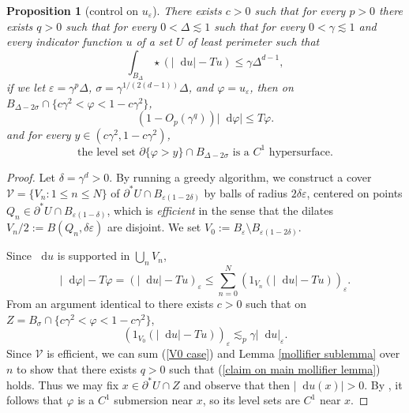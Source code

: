 \documentclass[reqno,12pt,letterpaper]{amsart}
\newcommand*\dif{\mathop{}\!\mathrm{d}}
\newcommand{\dfn}[1]{\emph{#1}\index{#1}}
\newtheorem{proposition}[theorem]{Proposition}
\theoremstyle{definition}
\numberwithin{equation}{section}
\begin{document}
\begin{proposition}[control on $u_\varepsilon$]\label{main mollifier lemma}
There exists $c > 0$ such that for every $p > 0$ there exists $q > 0$ such that for every $0 < \Delta \lesssim 1$ such that for every $0 < \gamma \lesssim 1$ and every indicator function $u$ of a set $U$ of least perimeter such that
\begin{equation}\label{hypothesis on main mollifier lemma}
\int_{B_\Delta} \star (|\dif u| - Tu) \leq \gamma \Delta^{d - 1},
\end{equation}
if we let $\varepsilon = \gamma^p\Delta$, $\sigma = \gamma^{1/(2(d - 1))}\Delta$, and $\varphi = u_\varepsilon$, then on $B_{\Delta - 2\sigma} \cap \{c\gamma^2 < \varphi < 1 - c\gamma^2\}$,
\begin{equation}\label{claim on main mollifier lemma}
(1 - O_p(\gamma^q)) |\dif \varphi| \leq T\varphi.
\end{equation}
and for every $y \in (c\gamma^2, 1 - c\gamma^2)$,
\begin{equation}\label{claim 2 on main mollifier lemma}
\text{the level set } \partial \{\varphi > y\} \cap B_{\Delta - 2\sigma} \text{ is a }C^1\text{ hypersurface}.
\end{equation}
\end{proposition}
\begin{proof}
Let $\delta = \gamma^d > 0$.
By running a greedy algorithm, we construct a cover $\mathcal V = \{V_n: 1 \leq n \leq N\}$ of $\partial^* U \cap B_{\varepsilon(1 - 2\delta)}$ by balls of radius $2\delta\varepsilon$, centered on points $Q_n \in \partial^* U \cap B_{\varepsilon(1 - \delta)}$, which is \dfn{efficient} in the sense that the dilates $V_n/2 := B(Q_n, \delta\varepsilon)$ are disjoint.
We set $V_0 := B_\varepsilon \setminus B_{\varepsilon(1 - 2\delta)}$.

Since $\dif u$ is supported in $\bigcup_n V_n$,
$$|\dif \varphi| - T\varphi = (|\dif u| - Tu)_\varepsilon \leq \sum_{n=0}^N (1_{V_n}(|\dif u| - Tu))_\varepsilon.$$
From an argument identical to \cite[pg92]{Giusti77} there exists $c > 0$ such that on $Z = B_\sigma \cap \{c\gamma^2 < \varphi < 1 - c\gamma^2\}$,
\begin{equation}\label{V0 case}
(1_{V_0}(|\dif u| - Tu))_\varepsilon \lesssim_p \gamma |\dif u|_\varepsilon.
\end{equation}
Since $\mathcal V$ is efficient, we can sum (\ref{V0 case}) and Lemma \ref{mollifier sublemma} over $n$ to show that there exists $q > 0$ such that (\ref{claim on main mollifier lemma}) holds. Thus we may fix $x \in \partial^* U \cap Z$ and observe that then $|\dif u(x)| > 0$.
By \cite[Remark 7.4]{Giusti77}, it follows that $\varphi$ is a $C^1$ submersion near $x$, so its level sets are $C^1$ near $x$.
\end{proof}
\end{document}
